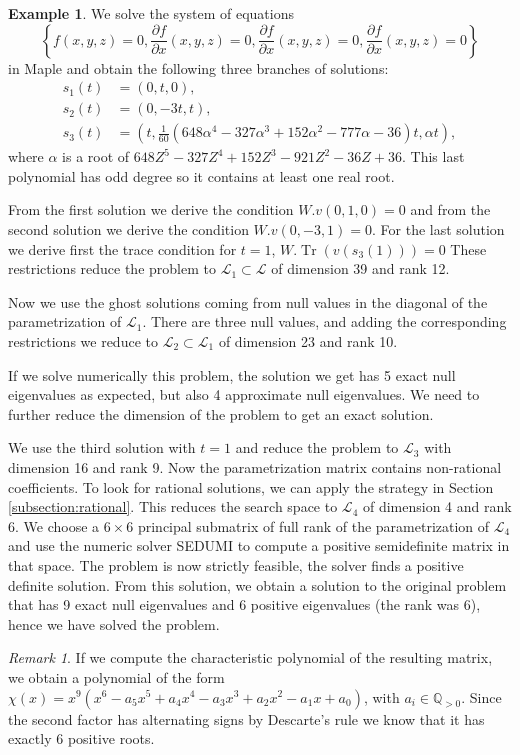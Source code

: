 \documentclass{amsart}
\theoremstyle{definition}
\newtheorem{example}[theorem]{Example}
\theoremstyle{remark}
\newtheorem{remark}[theorem]{Remark}
\numberwithin{equation}{section}
\DeclareMathOperator{\Tr}{Tr}
\newcommand{\eLL}{{\mathcal L}}
\newcommand{\Q}{{\mathbb Q}}
\begin{document}
\begin{example}
We solve the system of equations
\[
\left\{f(x,y,z) = 0, \frac{\partial f}{\partial x}(x,y,z) = 0, \frac{\partial f}{\partial x}(x,y,z) = 0, \frac{\partial f}{\partial x}(x,y,z) = 0\right\}
\]
in Maple and obtain the following three branches of solutions:
\begin{align*}
s_1(t) &= (0, t, 0), \\
s_2(t) &= (0, -3t, t), \\
s_3(t) &= (t, \frac{1}{60}(648\alpha^4-327\alpha^3+152\alpha^2-777\alpha-36)t, \alpha t),
\end{align*}
where $\alpha$ is a root of $648Z^5-327Z^4+152Z^3-921Z^2-36Z+36$. This last polynomial has odd degree so it contains at least one real root.

From the first solution we derive the condition $W . v(0,1,0) = 0$ and from the second solution we derive the condition $W . v(0,-3,1) = 0$.
For the last solution we derive first the trace condition for $t = 1$, $W . \Tr(v(s_3(1))) = 0$ These restrictions reduce the problem to $\eLL_1 \subset \eLL$ of dimension 39 and rank 12.

Now we use the ghost solutions coming from null values in the diagonal of the parametrization of $\eLL_1$. There are three null values, and adding the corresponding restrictions we reduce to $\eLL_2 \subset \eLL_1$ of dimension 23 and rank 10.

If we solve numerically this problem, the solution we get has 5 exact null eigenvalues as expected, but also 4 approximate null eigenvalues.
We need to further reduce the dimension of the problem to get an exact solution.

We use the third solution with $t = 1$ and reduce the problem to $\eLL_3$ with dimension 16 and rank 9. Now the parametrization matrix contains non-rational coefficients. To look for rational solutions, we can apply the strategy in Section \ref{subsection:rational}. This reduces the search space to $\eLL_4$ of dimension 4 and rank 6.
We choose a $6 \times 6$ principal submatrix of full rank of the parametrization of $\eLL_4$ and use the numeric solver SEDUMI to compute a positive semidefinite matrix in that space. The problem is now strictly feasible, the solver finds a positive definite solution. From this solution, we obtain a solution to the original problem that has 9 exact null eigenvalues and 6 positive eigenvalues (the rank was 6), hence we have solved the problem.

\begin{remark}
If we compute the characteristic polynomial of the resulting matrix, we obtain a polynomial of the form $\chi(x) = x^9 (x^6-a_5 x^5 + a_4 x^4 - a_3 x^3 + a_2 x^2 - a_1 x + a_0)$, with $a_i \in \Q_{>0}$. Since the second factor has alternating signs by Descarte's rule we know that it has exactly 6 positive roots.
\end{remark}

\end{example}
\end{document}
